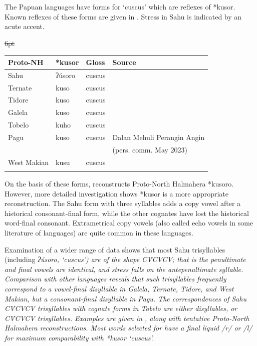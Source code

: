 The Papuan  languages have forms for ‘cuscus’
which are reflexes of *kusor.
Known reflexes of these forms are given in .
Stress in Sahu is indicated by an acute accent.

\begin{table}[h]
	\centering{}
	\st{6pt}\begin{tabular}{l|lll}\lsptoprule
Proto-NH	&	*kusor	&	Gloss	&	Source \\ \midrule
Sahu	&	ʔúsoro	&	cuscus	&	\citet[131]{VisserVoorhoeve1987} \\
Ternate	&	kuso	&	cuscus	&	\citet[269]{Schapper2011} \\
Tidore	&	kuso	&	cuscus	&	\citet[269]{Schapper2011} \\
Galela	&	kuso	&	cuscus	&	\citet[223]{vanBaarda1895} \\
Tobelo	&	kuho	&	cuscus	&	\citet[212]{Hueting1908}\\
Pagu	&	kuso	&	cuscus	&	Dalan Mehuli Perangin Angin \\
			&						&					&	(pers. comm. May 2023)  \\
West Makian	&	kusu	&	cuscus	&	\citet[81]{Collins1982b} \\
		\lspbottomrule
	\end{tabular}
\end{table}

On the basis of these forms,
\citet[269]{Schapper2011} reconstructs Proto-North Halmahera *kusoro.
However, more detailed investigation shows *kusor is a more appropriate reconstruction.
The Sahu form with three syllables adds a copy vowel after a
historical consonant-final form, while the other cognates have lost the historical word-final consonant.
Extrametrical copy vowels (also called echo vowels in some literature
of  languages) are quite common in these languages.

Examination of a wider range of data shows that most Sahu trisyllables
(including \it{ʔúsoro}, ‘cuscus’) are of the shape CV́CVCV; that
is the penultimate and final vowels are identical,
and stress falls on the antepenultimate syllable.
Comparison with other  languages reveals
that such trisyllables frequently correspond to a vowel-final
disyllable in Galela, Ternate, Tidore, and West Makian, but a consonant-final disyllable in Pagu.
The correspondences of Sahu CV́CVCV trisyllables
with cognate forms in Tobelo are either disyllables, or CV́CVCV trisyllables.
Examples are given in ,
along with tentative Proto-North Halmahera reconstructions.
Most words selected for  have a final liquid /r/ or
/l/ for maximum comparability with *kusor ‘cuscus’.

